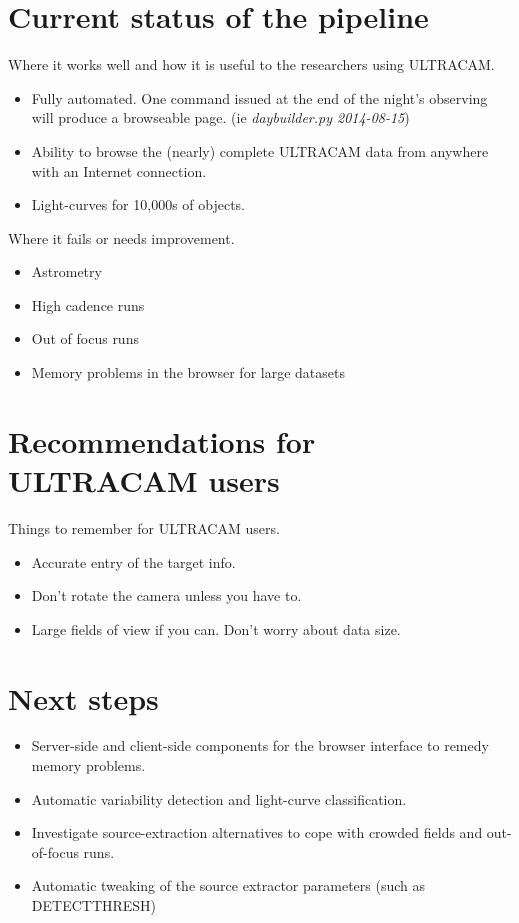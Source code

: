 
\section{Current status of the pipeline}

Where it works well and how it is useful to the researchers using ULTRACAM.
\begin{itemize}
  \item Fully automated. One command issued at the end of the night's observing will produce a browseable page. (ie \emph{daybuilder.py 2014-08-15})
  \item Ability to browse the (nearly) complete ULTRACAM data from anywhere with an Internet connection. 
  \item Light-curves for 10,000s of objects.
\end{itemize}

Where it fails or needs improvement.
\begin{itemize}
  \item Astrometry
  \item High cadence runs
  \item Out of focus runs
  \item Memory problems in the browser for large datasets 
\end{itemize}

\section{Recommendations for ULTRACAM users}

Things to remember for ULTRACAM users. 
\begin{itemize}
	\item Accurate entry of the target info.
	\item Don't rotate the camera unless you have to.
	\item Large fields of view if you can. Don't worry about data size. 
\end{itemize} 

\section{Next steps}
\begin{itemize}
	\item Server-side and client-side components for the browser interface to remedy memory problems.
	\item Automatic variability detection and light-curve classification. 
	\item Investigate source-extraction alternatives to cope with crowded fields and out-of-focus runs.
	\item Automatic tweaking of the source extractor parameters (such as DETECT\textunderscore THRESH)
\end{itemize} 
 

